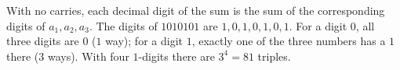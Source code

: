 With no carries, each decimal digit of the sum is the sum of the corresponding digits of $a_1,a_2,a_3$. The digits of $1010101$ are $1,0,1,0,1,0,1$. For a digit $0$, all three digits are $0$ ($1$ way); for a digit $1$, exactly one of the three numbers has a $1$ there ($3$ ways). With four $1$-digits there are $3^4=\boxed{81}$ triples.
